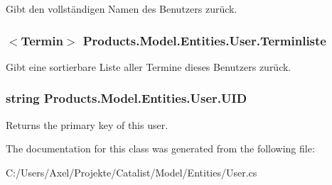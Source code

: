 Gibt den vollständigen Namen des Benutzers zurück. 

\subsubsection[{\texorpdfstring{Terminliste}{Terminliste}}]{$<${\bf Termin}$>$ Products.\+Model.\+Entities.\+User.\+Terminliste\hspace{0.3cm}{\ttfamily [get]}}\hypertarget{class_products_1_1_model_1_1_entities_1_1_user_a4285b5084deca4eb33f9b91900c88aad}{}\label{class_products_1_1_model_1_1_entities_1_1_user_a4285b5084deca4eb33f9b91900c88aad}


Gibt eine sortierbare Liste aller Termine dieses Benutzers zurück. 

\subsubsection[{\texorpdfstring{U\+ID}{UID}}]{\setlength{\rightskip}{0pt plus 5cm}string Products.\+Model.\+Entities.\+User.\+U\+ID\hspace{0.3cm}{\ttfamily [get]}}\hypertarget{class_products_1_1_model_1_1_entities_1_1_user_abf237dca4fdc1facc2aac17b8d078a66}{}\label{class_products_1_1_model_1_1_entities_1_1_user_abf237dca4fdc1facc2aac17b8d078a66}


Returns the primary key of this user. 



The documentation for this class was generated from the following file\+:\begin{DoxyCompactItemize}
\item 
C\+:/\+Users/\+Axel/\+Projekte/\+Catalist/\+Model/\+Entities/User.\+cs\end{DoxyCompactItemize}
